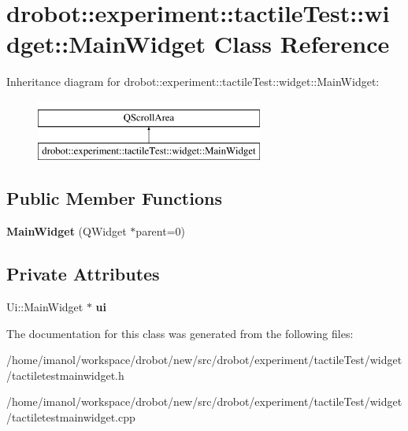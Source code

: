 \hypertarget{classdrobot_1_1experiment_1_1tactileTest_1_1widget_1_1MainWidget}{\section{drobot\-:\-:experiment\-:\-:tactile\-Test\-:\-:widget\-:\-:Main\-Widget Class Reference}
\label{classdrobot_1_1experiment_1_1tactileTest_1_1widget_1_1MainWidget}
}
Inheritance diagram for drobot\-:\-:experiment\-:\-:tactile\-Test\-:\-:widget\-:\-:Main\-Widget\-:\begin{figure}[H]
\begin{center}
\leavevmode
\includegraphics[height=2.000000cm]{classdrobot_1_1experiment_1_1tactileTest_1_1widget_1_1MainWidget}
\end{center}
\end{figure}
\subsection*{Public Member Functions}
\begin{DoxyCompactItemize}
\item 
\hypertarget{classdrobot_1_1experiment_1_1tactileTest_1_1widget_1_1MainWidget_a65b43165ab8b3ce3b6a38f62f27a1c8b}{{\bfseries Main\-Widget} (Q\-Widget $\ast$parent=0)}\label{classdrobot_1_1experiment_1_1tactileTest_1_1widget_1_1MainWidget_a65b43165ab8b3ce3b6a38f62f27a1c8b}

\end{DoxyCompactItemize}
\subsection*{Private Attributes}
\begin{DoxyCompactItemize}
\item 
\hypertarget{classdrobot_1_1experiment_1_1tactileTest_1_1widget_1_1MainWidget_a2a6ebbf269a8bae0f9a5aef294d3d7c6}{Ui\-::\-Main\-Widget $\ast$ {\bfseries ui}}\label{classdrobot_1_1experiment_1_1tactileTest_1_1widget_1_1MainWidget_a2a6ebbf269a8bae0f9a5aef294d3d7c6}

\end{DoxyCompactItemize}


The documentation for this class was generated from the following files\-:\begin{DoxyCompactItemize}
\item 
/home/imanol/workspace/drobot/new/src/drobot/experiment/tactile\-Test/widget/tactiletestmainwidget.\-h\item 
/home/imanol/workspace/drobot/new/src/drobot/experiment/tactile\-Test/widget/tactiletestmainwidget.\-cpp\end{DoxyCompactItemize}
